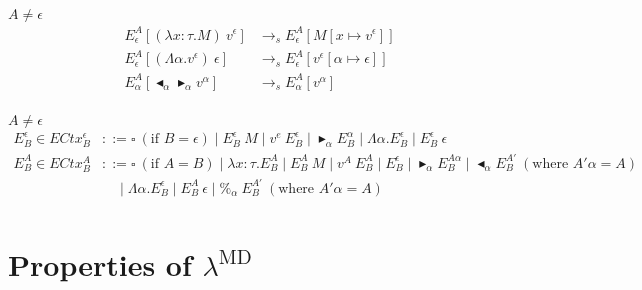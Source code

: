 \documentclass[runningheads]{llncs}
\newcommand{\LMD}{$\lambda^{\textrm{MD}}$}
\newcommand{\TB}{\blacktriangleright}
\newcommand{\TBL}{\blacktriangleleft}
\begin{document}
\begin{definition}
$A \neq \epsilon$\\
\begin{align*}
    E^A_\epsilon [(\lambda x:\tau.M)\ v^\epsilon] & \longrightarrow_s E^A_\epsilon[M[x\mapsto v^\epsilon]] \\
    E^A_\epsilon [(\Lambda\alpha.v^\epsilon)\ \epsilon] & \longrightarrow_s E^A_\epsilon[v^\epsilon[\alpha\mapsto \epsilon]] \\
    E^A_\alpha [\TBL_\alpha \TB_\alpha v^\alpha] & \longrightarrow_s E^A_\alpha[v^\alpha] \\
\end{align*}
\end{definition}

\begin{definition}
$A \neq \epsilon$\\
\begin{align*}
    E^\epsilon_B \in ECtx^\epsilon_B & ::= \square\ (\text{if\ } B = \epsilon) \mid E^\epsilon_B\ M \mid v^e\ E^\epsilon_B
                                           \mid \TB_\alpha E^\alpha_B \mid \Lambda\alpha.E^\epsilon_B
                                           \mid E^\epsilon_B\ \epsilon  \\
    E^A_B \in ECtx^A_B & ::= \square\ (\text{if } A = B) \mid \lambda x:\tau.E^A_B \mid E^A_B\ M \mid v^A\ E^A_B
                                           \mid E^\epsilon_B \mid \TB_\alpha E^{A\alpha}_B
                                           \mid \TBL_\alpha E^{A'}_B \ (\text{where } A'\alpha = A) \\
                                           & \quad \mid \Lambda\alpha.E^\epsilon_B
                                           \mid E^A_B\ \epsilon \mid \%_\alpha\ E^{A'}_B \ (\text{where } A'\alpha = A)\\
\end{align*}
\end{definition}

\section{Properties of \LMD}
\end{document}
